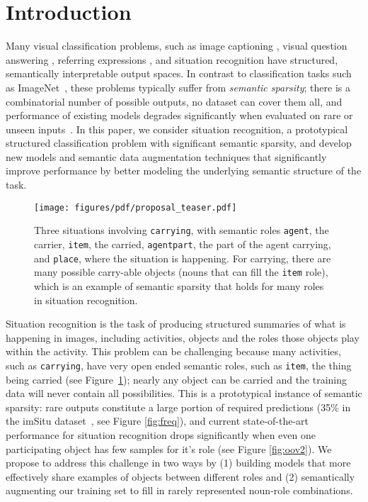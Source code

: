 \documentclass[10pt,twocolumn,letterpaper]{article}
\begin{document}
\section{Introduction}
Many visual classification problems, such as image captioning \cite{mscoco}, visual question answering \cite{vqa}, referring expressions \cite{referit}, and situation recognition \cite{yatskar2016} have structured, semantically interpretable output spaces. 
In contrast to classification tasks such as ImageNet~\cite{imagenet}, these problems typically suffer from \textit{semantic sparsity}; there is a combinatorial number of possible outputs, no dataset can cover them all, and performance of existing models degrades significantly when evaluated on rare or unseen inputs~\cite{atzmon2016learning,zhou2015simple,devlin2015exploring,yatskar2016}. In this paper, we consider situation recognition, a prototypical structured classification problem with significant semantic sparsity, and develop new models and semantic data augmentation techniques that significantly improve performance by better modeling the underlying semantic structure of the task.






\begin{figure}[t]
\centering
\hspace*{-10pt}
\texttt{[image: figures/pdf/proposal\_teaser.pdf]}
\caption{\small Three situations involving \texttt{carrying}, with semantic roles \texttt{agent}, the carrier, \texttt{item}, the carried, \texttt{agentpart}, the part of the agent carrying, and \texttt{place}, where the situation is happening. For carrying, there are many possible carry-able objects (nouns that can fill the \texttt{item} role), which is an example of semantic sparsity that holds for many roles in situation recognition.}
\label{fig:leading}
\end{figure}



Situation recognition \cite{yatskar2016} is the task of producing structured summaries of what is happening in images, including activities, objects and the roles those objects play within the activity.
This problem can be challenging because many activities, such as \texttt{carrying}, have very open ended semantic roles, such as \texttt{item}, the thing being carried (see Figure~\ref{fig:leading}); nearly any object can be carried and the training data will never contain all possibilities. This is a prototypical instance of semantic sparsity: rare outputs constitute a large portion of required predictions (35\% in the imSitu dataset~\cite{yatskar2016}, see Figure \ref{fig:freq}), and current state-of-the-art performance for situation recognition drops significantly when even one participating object has few samples for it's role (see Figure \ref{fig:oov2}). 
We propose to address this challenge in two ways by (1) building models that more effectively share examples of objects between different roles and (2) semantically augmenting our training set to fill in rarely represented noun-role combinations.
\end{document}
